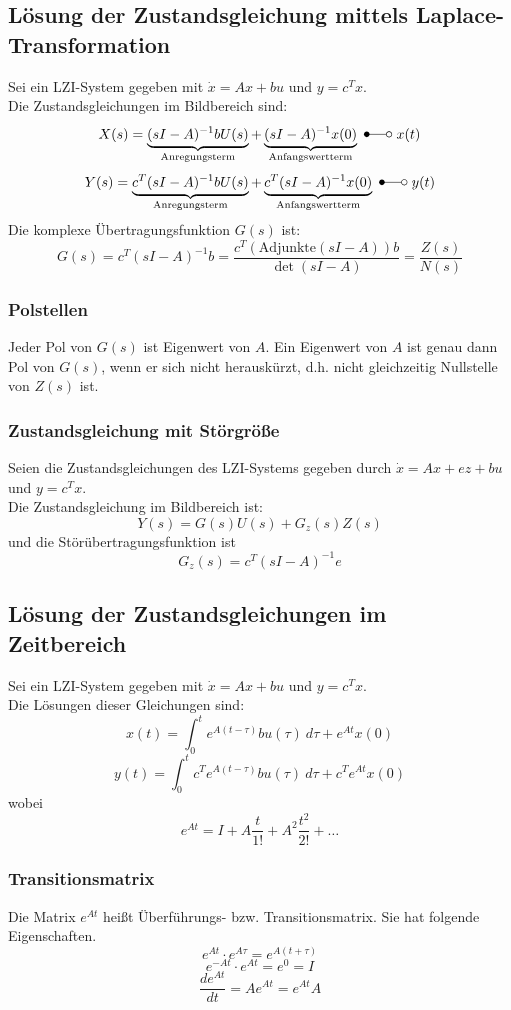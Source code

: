 \documentclass[10pt,a4paper]{article}
\begin{document}
\subsection{Lösung der Zustandsgleichung mittels Laplace-Transformation}
Sei ein LZI-System gegeben mit $\dot x = Ax + bu$ und $y = c^T x$. \\
Die Zustandsgleichungen im Bildbereich sind:
$$
	X(s) = \underbrace{(sI-A)^{-1} b U(s)}_{\text{Anregungsterm}} + \underbrace{(sI-A)^{-1} x(0)}_{\text{Anfangswertterm}} ~\Laplace ~x(t)
$$
$$
	Y(s) = \underbrace{c^T(sI-A)^{-1} b U(s)}_{\text{Anregungsterm}} + \underbrace{c^T (sI - A)^{-1} x(0)}_{\text{Anfangswertterm}} ~\Laplace ~y(t)
$$
Die komplexe Übertragungsfunktion $G(s)$ ist:
$$
	G(s) = c^T(sI - A)^{-1} b = \frac{c^T(\textrm{Adjunkte}(sI-A))b}{\det(sI-A)} = \frac{Z(s)}{N(s)}
$$

\subsubsection{Polstellen}
Jeder Pol von $G(s)$ ist Eigenwert von $A$. Ein Eigenwert von $A$ ist genau dann Pol von $G(s)$, wenn er sich nicht herauskürzt, d.h. nicht gleichzeitig Nullstelle von $Z(s)$ ist.

\subsubsection{Zustandsgleichung mit Störgröße}
Seien die Zustandsgleichungen des LZI-Systems gegeben durch $\dot x = Ax + ez + bu$ und $y = c^T x$. \\
Die Zustandsgleichung im Bildbereich ist:
$$
	Y(s) = G(s) U(s) + G_z(s) Z(s)
$$
und die Störübertragungsfunktion ist
$$
	G_z(s) = c^T(sI-A)^{-1}e
$$

\subsection{Lösung der Zustandsgleichungen im Zeitbereich}
Sei ein LZI-System gegeben mit $\dot x = Ax + bu$ und $y = c^T x$. \\
Die Lösungen dieser Gleichungen sind:
$$
	x(t) = \int_0^t e^{A(t-\tau)} b u(\tau) ~d\tau + e^{At} x(0)
$$
$$
	y(t) = \int_0^t c^T e^{A(t-\tau)} bu(\tau) ~d\tau + c^T e^{At} x(0)
$$
wobei
$$
	e^{At} = I + A\frac{t}{1!} + A^2 \frac{t^2}{2!} + \dots
$$

\subsubsection{Transitionsmatrix}
Die Matrix $e^{At}$ heißt Überführungs- bzw. Transitionsmatrix.
Sie hat folgende Eigenschaften.
$$
	e^{At} ⋅ e^{A\tau} = e^{A(t + \tau)}
$$
$$
	e^{-At} ⋅ e^{At} = e^0 = I
$$
$$	
	\frac{d e^{At}}{dt} = Ae^{At} = e^{At} A
$$
\end{document}
